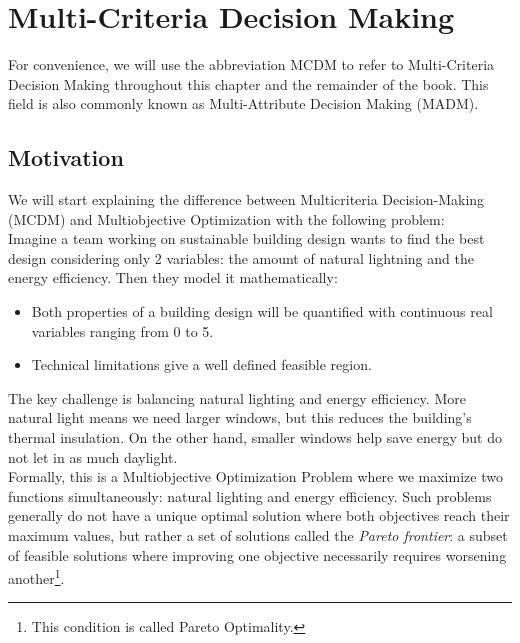\chapter{Multi-Criteria Decision Making}

For convenience, we will use the abbreviation MCDM to refer to Multi-Criteria Decision Making throughout this chapter and the remainder of the book. This field is also commonly known as Multi-Attribute Decision Making (MADM).



\section*{Motivation}
We will start explaining the difference between Multicriteria Decision-Making (MCDM) and Multiobjective Optimization with the following problem:\\

Imagine a team working on \textnormal{sustainable building design} wants to find the best design considering only 2 variables: the amount of natural lightning and the energy efficiency. Then they model it mathematically:\vspace{-0.7em}
\begin{itemize}
    \item Both properties of a building design will be quantified with continuous real variables ranging from 0 to 5.\vspace{-0.8em}
    \item Technical limitations give a well defined feasible region.\vspace{-0.7em}
\end{itemize}
The key challenge is balancing natural lighting and energy efficiency. More natural light means we need larger windows, but this reduces the building's thermal insulation. On the other hand, smaller windows help save energy but do not let in as much daylight.\\

Formally, this is a Multiobjective Optimization Problem where we maximize two functions simultaneously: natural lighting and energy efficiency. Such problems generally do not have a unique optimal solution where both objectives reach their maximum values, but rather a set of solutions called the \textit{Pareto frontier}: a subset of feasible solutions where improving one objective necessarily requires worsening another\footnote{This condition is called Pareto Optimality.}.\\


